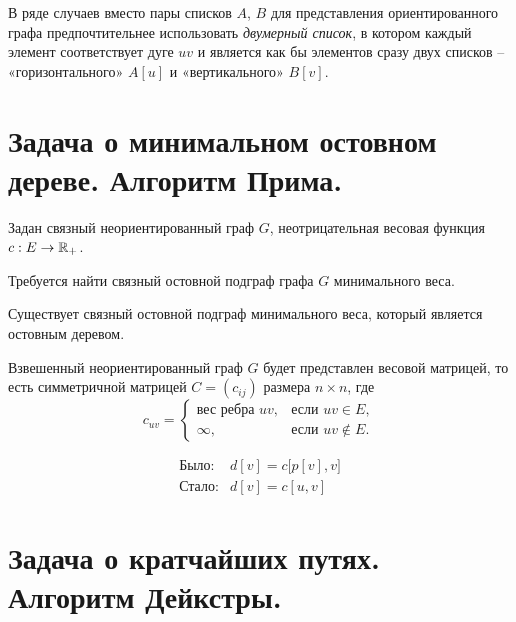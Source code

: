 \begin{note}
\begin{description}
\begin{description}
                        В ряде случаев вместо пары списков $ A $, $ B $ для представления ориентированного графа предпочтительнее использовать \emph{двумерный список}, в котором каждый элемент соответствует дуге $ uv $ и является как бы элементов сразу двух списков – «горизонтального» $ A[u] $ и «вертикального» $ B[v] $.
              \end{description}
    \end{description}
\end{note}

\section{Задача о минимальном остовном дереве. Алгоритм Прима.}

\begin{note}[ТГ постановка]
    Задан связный неориентированный граф $ G $, неотрицательная весовая функция $ c: E \rightarrow \mathbb{R}_+ $.

    Требуется найти связный остовной подграф графа $ G $ минимального веса.
\end{note}

\begin{remark}
    Существует связный остовной подграф минимального веса, который является остовным деревом.
\end{remark}

\begin{note}
    Взвешенный неориентированный граф $ G $ будет представлен весовой матрицей, то есть симметричной матрицей $ C = (c_{ij}) $ размера $ n \times n $, где
    \[
        c_{uv} = \left\{\begin{array}{ll}
            \text{вес ребра }uv, & \text{если }uv \in E,     \\
            \infty,              & \text{если } uv \notin E.
        \end{array}\right.
    \]
    \begin{figure}[H]
        \centering
        \label{fig:fig_30}
    \end{figure}
    \[
        \begin{array}{ll}
            \text{Было:}  & d[v] = c\big[p[v],v\big] \\
            \text{Стало:} & d[v] = c[u,v]
        \end{array}
    \]
\end{note}

\section{Задача о кратчайших путях. Алгоритм Дейкстры.}

